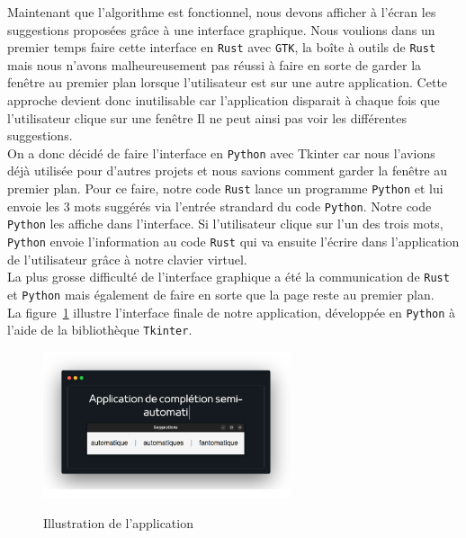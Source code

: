 \documentclass[a4paper, 11pt]{report}
\newcommand{\langage}[1]{\texttt{#1}}
\begin{document}
{Maintenant que l'algorithme est fonctionnel, nous devons afficher à l'écran les suggestions proposées grâce à une interface graphique. Nous voulions dans un premier temps faire cette interface en \langage{Rust} avec \langage{GTK}, la boîte à outils de \langage{Rust}  mais nous n'avons malheureusement pas réussi à faire en sorte de garder la fenêtre au premier plan lorsque l'utilisateur est sur une autre application. Cette approche devient donc inutilisable car l'application disparait à chaque fois que l'utilisateur clique sur une fenêtre Il ne peut ainsi pas voir les différentes suggestions.\\

On a donc décidé de faire l'interface en \langage{Python} avec Tkinter car nous l'avions déjà utilisée pour d'autres projets et nous savions comment garder la fenêtre au premier plan. Pour ce faire, notre code \langage{Rust} lance un programme \langage{Python} et lui envoie les 3 mots suggérés via l'entrée strandard du code \langage{Python}. Notre code \langage{Python} les affiche dans l'interface. Si l'utilisateur clique sur l'un des trois mots, \langage{Python} envoie l'information au code \langage{Rust} qui va ensuite l'écrire dans l'application de l'utilisateur grâce à notre clavier virtuel.\\

La plus grosse difficulté de l'interface graphique a été la communication de \langage{Rust} et \langage{Python} mais également de faire en sorte que la page reste au premier plan.\\

La figure~\ref{fig:lecture_fichier} illustre l’interface finale de notre application, développée en \langage{Python} à l’aide de la bibliothèque \langage{Tkinter}.

\begin{figure}[H]
	\begin{center}
		{\includegraphics[width=0.65\textwidth]{images/illustration.png}}
	\end{center}
	\caption{Illustration de l'application}
	\label{fig:lecture_fichier}
\end{figure}

}
\end{document}
